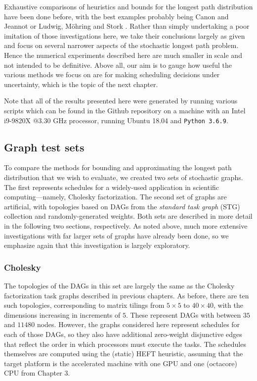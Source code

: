\documentclass[12pt]{article}
\begin{document}
Exhaustive comparisons of heuristics and bounds for the longest path distribution have been done before, with the best examples probably being Canon and Jeannot \cite{can16} or Ludwig, M{\"o}hring and Stork \cite{lud01}. Rather than simply undertaking a poor imitation of those investigations here, we take their conclusions largely as given and focus on several narrower aspects of the stochastic longest path problem. Hence the numerical experiments described here are much smaller in scale and not intended to be definitive. Above all, our aim is to gauge how useful the various methods we focus on are for making scheduling decisions under uncertainty, which is the topic of the next chapter.

Note that all of the results presented here were generated by running various scripts which can be found in the Github repository on a machine with an Intel i9-9820X @3.30 GHz processor, running Ubuntu 18.04 and {\tt Python 3.6.9}. 

\subsection{Graph test sets}
\label{subsect.graphs}

To compare the methods for bounding and approximating the longest path distribution that we wish to evaluate, we created two sets of stochastic graphs. The first represents schedules for a widely-used application in scientific computing---namely, Cholesky factorization. The second set of graphs are artificial, with topologies based on DAGs from the {\em standard task graph} (STG) collection \cite{tob02} and randomly-generated weights. Both sets are described in more detail in the following two sections, respectively. As noted above, much more extensive investigations with far larger sets of graphs have already been done, so we emphasize again that this investigation is largely exploratory.

\subsubsection{Cholesky}
\label{subsubsect.cholesky}

The topologies of the DAGs in this set are largely the same as the Cholesky factorization task graphs described in previous chapters. As before, there are ten such topologies, corresponding to matrix tilings from $5 \times 5$ to $40 \times 40$, with the dimensions increasing in increments of $5$. These represent DAGs with between $35$ and $11480$ nodes. However, the graphs considered here represent schedules for each of those DAGs, so they also have additional zero-weight disjunctive edges that reflect the order in which processors must execute the tasks. The schedules themselves are computed using the (static) HEFT heuristic, assuming that the target platform is the accelerated machine with one GPU and one (octacore) CPU from Chapter 3.
\end{document}
